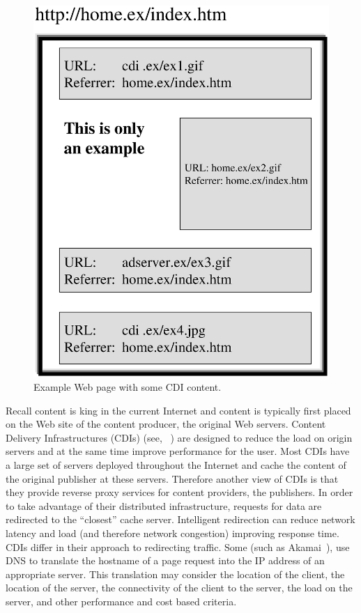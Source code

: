 \begin{figure} 
\begin{center}
\includegraphics[width=0.6\linewidth]{figures/page.eps}
\vspace*{-.7cm}
\end{center}
\caption{Example Web page with some CDI content.}
\label{fig:aka:cdn_page}
\end{figure}

Recall content is king in the current Internet and content is typically first
placed on the Web site of the content producer, the original Web servers.
Content Delivery Infrastructures (CDIs) (see,
\eg~\cite{cdn:2002,akamai:2002,gadde01web,bent02whole,johnson00measured,bala:imw01,gribble:osdi02})
are designed to reduce the load on origin servers and at the same time improve
performance for the user.  Most CDIs have a large set of servers deployed
throughout the Internet and cache the content of the original publisher at
these servers.  Therefore another view of CDIs is that they provide reverse
proxy services for content providers, the publishers.  In order to take
advantage of their distributed infrastructure, requests for data are redirected
to the ``closest'' cache server. Intelligent redirection can reduce network
latency and load (and therefore network congestion) improving response time.
CDIs differ in their approach to redirecting traffic. Some (such as
Akamai~\cite{Akamai-Network}), use DNS to translate the hostname of a page
request into the IP address of an appropriate server. This translation may
consider the location of the client, the location of the server, the
connectivity of the client to the server, the load on the server, and other
performance and cost based criteria.

